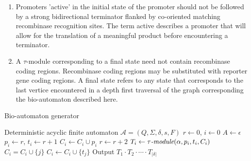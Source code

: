 \documentclass{article}
\begin{document}
\begin{enumerate}
\item Promoters 'active' in the initial state of the promoter should not be followed by a strong bidirectional terminator flanked by co-oriented matching recombinase recognition sites.  The term active describes a promoter that will allow for the translation of a meaningful product before encountering a terminator. 
\item A $\tau$-module corresponding to a final state need not contain recombinase coding regions.  Recombinase coding regions may be substituted with reporter gene coding regions.  A final state refers to any state that corresponds to the last vertice encountered in a depth first traversal of the graph corresponding the bio-automaton described here.	
\end{enumerate}

\begin{algorithm}
\caption{\sc Bio-automaton generator}
\begin{algorithmic}[1]
    \REQUIRE Deterministic acyclic finite automaton $\mathcal{A} = (Q, \Sigma, \delta, s, F)$
    \STATE $r \leftarrow 0$, $i \leftarrow 0$
    \STATE $A \leftarrow \epsilon$
            \STATE $p_i \leftarrow r$, $t_i \leftarrow r+1$
            \STATE $C_i \leftarrow C_i \cup p_i$
            \STATE $r \leftarrow r+2$
            \STATE $T_i \leftarrow \tau\textrm{\it-module}(\alpha, p_i, t_i, C_i)$
        \ENDFOR
                \STATE $C_i = C_i \cup \{j\}$
            \ENDFOR
        \ENDFOR
            \STATE $C_i \leftarrow C_i \cup \{t_j\}$
        \ENDFOR
    \ENDFOR
    \STATE Output $T_1 \cdot T_2 \cdot \cdots \cdot T_{|\delta|}$
\end{algorithmic}
\end{algorithm}
\newpage%
\end{document}

